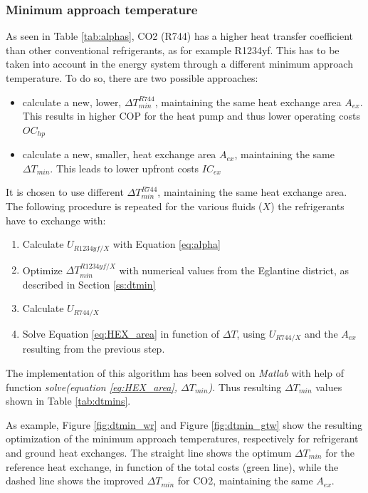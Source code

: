 \documentclass{article}
\begin{document}
\subsubsection{Minimum approach temperature}
As seen in Table \ref{tab:alphas}, CO2 (R744) has a higher heat transfer coefficient than other conventional refrigerants, as for example R1234yf. This has to be taken into account in the energy system through a different minimum approach temperature. To do so, there are two possible approaches:
\begin{itemize}
	\item calculate a new, lower, $\Delta T_{min}^{R744}$, maintaining the same heat exchange area $A_{ex}$. This results in higher COP for the heat pump and thus lower operating costs $OC_{hp}$
	\item calculate a new, smaller, heat exchange area  $A_{ex}$, maintaining the same $\Delta T_{min}$. This leads to lower upfront costs $IC_{ex}$
\end{itemize}

It is chosen to use different $\Delta T_{min}^{R744}$, maintaining the same heat exchange area. The following procedure is repeated for the various fluids ($X$) the refrigerants have to exchange with:
\begin{enumerate}
	\item Calculate $U_{R1234yf/X}$ with Equation \ref{eq:alpha}
	\item Optimize $\Delta T_{min}^{R1234yf/X}$ with numerical values from the Eglantine district, as described in Section \ref{ss:dtmin}
	\item Calculate  $U_{R744/X}$ 
	\item Solve Equation \ref{eq:HEX_area} in function of $\Delta T$, using $U_{R744/X}$ and the $A_{ex}$ resulting from the previous step.
\end{enumerate}

The implementation of this algorithm has been solved on \textit{Matlab} with help of function \textit{solve(equation \ref{eq:HEX_area}, $\Delta T_{min}$)}.
Thus resulting $\Delta T_{min}$ values shown in Table \ref{tab:dtmins}.



As example, Figure \ref{fig:dtmin_wr} and Figure \ref{fig:dtmin_gtw} show the resulting optimization of the minimum approach temperatures, respectively for refrigerant and ground heat exchanges. The straight line shows the optimum $\Delta T_{min}$ for the reference heat exchange, in function of the total costs (green line), while the dashed line shows the improved $\Delta T_{min}$ for CO2, maintaining the same $A_{ex}$.
\end{document}
